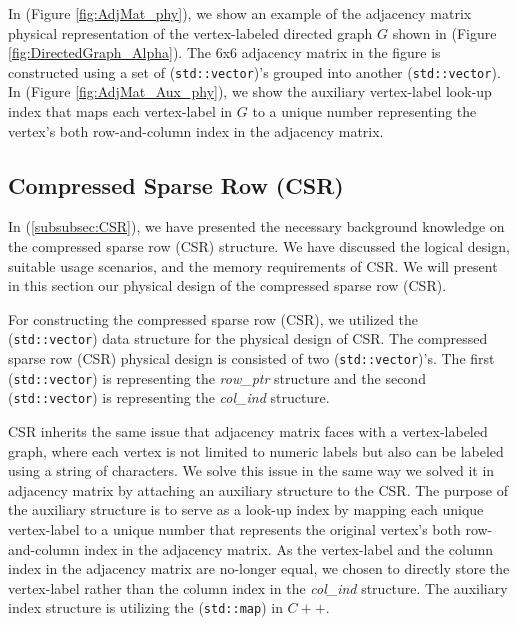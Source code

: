 {In (Figure \ref{fig:AdjMat_phy}), we show an example of the adjacency matrix physical representation of the vertex-labeled directed graph $G$ shown in (Figure \ref{fig:DirectedGraph_Alpha}). The 6x6 adjacency matrix in the figure is constructed using a set of (\texttt{std::vector})'s grouped into another (\texttt{std::vector}). In (Figure \ref{fig:AdjMat_Aux_phy}), we show the auxiliary vertex-label look-up index that maps each vertex-label in $G$ to a unique number representing the vertex's both row-and-column index in the adjacency matrix.



\subsection{Compressed Sparse Row (CSR)}
\label{subsec:PhyDesign-CSR}

In (\ref{subsubsec:CSR}), we have presented the necessary background knowledge on the compressed sparse row (CSR) structure. We have discussed the logical design, suitable usage scenarios, and the memory requirements of CSR. We will present in this section our physical design of the compressed sparse row (CSR).



For constructing the compressed sparse row (CSR), we utilized the (\texttt{std::vector}) data structure for the physical design of CSR. The compressed sparse row (CSR) physical design is consisted of two (\texttt{std::vector})'s. The first (\texttt{std::vector}) is representing the \textit{row\_ptr} structure and the second (\texttt{std::vector}) is representing the \textit{col\_ind} structure.

CSR inherits the same issue that adjacency matrix faces with a vertex-labeled graph, where each vertex is not limited to numeric labels but also can be labeled using a string of characters. We solve this issue in the same way we solved it in adjacency matrix by attaching an auxiliary structure to the CSR. The purpose of the auxiliary structure is to serve as a look-up index by mapping each unique vertex-label to a unique number that represents the original vertex's both row-and-column index in the adjacency matrix. As the vertex-label and the column index in the adjacency matrix are no-longer equal, we chosen to directly store the vertex-label rather than the column index in the \textit{col\_ind} structure. The auxiliary index structure is utilizing the (\texttt{std::map}) in $C++$.

}
